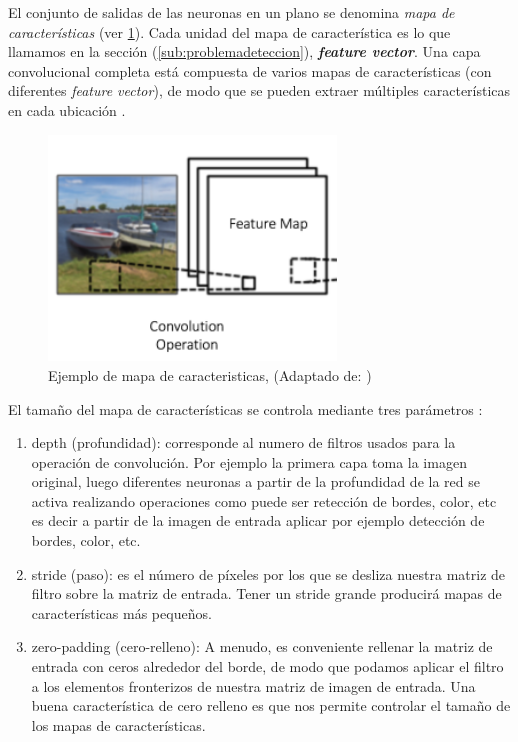 El conjunto de salidas de las neuronas en un plano se denomina \textit{mapa de características} (ver \ref{Fig: fmaps}). Cada unidad  del mapa de característica es lo que llamamos en la sección (\ref{sub:problemadeteccion}),  \textit{\textbf{feature vector}}. Una capa convolucional completa está compuesta de varios mapas de características (con diferentes 
\textit{feature vector}), de modo que se pueden extraer múltiples características en cada ubicación \citep{cnns}.

\begin{figure}[H]
 \centering
  \includegraphics[height=6cm,keepaspectratio=true,clip=true]{imagenes/Logos/fmaps.png}
  \caption{Ejemplo de mapa de caracteristicas, (Adaptado de: \citep{cnnsarticle})}
	\label{Fig: fmaps}
\end{figure}

El tamaño del mapa de características se controla mediante tres parámetros \citep{cnnsarticle}:
\begin{enumerate}
\item depth (profundidad): corresponde al numero de filtros usados para la operación de convolución. Por ejemplo la primera capa toma la imagen original, luego diferentes neuronas a partir de la profundidad de la red se activa realizando operaciones como puede ser retección de bordes, color, etc
es decir a partir de la imagen de entrada aplicar por ejemplo detección de bordes, color, etc.
\item stride (paso): es el número de píxeles por los que se desliza nuestra matriz de filtro sobre la matriz de entrada. Tener un stride grande producirá mapas de características más pequeños.
\item zero-padding (cero-relleno): A menudo, es conveniente rellenar la matriz de entrada con ceros alrededor del borde, de modo que podamos aplicar el filtro a los elementos fronterizos de nuestra matriz de imagen de entrada. Una buena característica de cero relleno es que nos permite controlar el tamaño de los mapas de características.
\end{enumerate}



